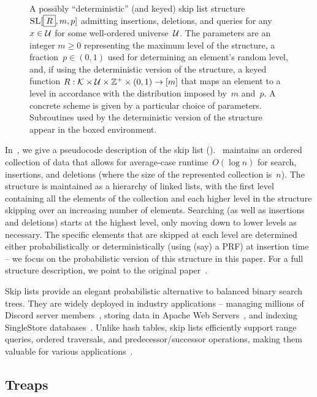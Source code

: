 \begin{figure*}[h]
\begin{pchstack}[boxed,center,space=0.5em]
    \end{pchstack}
    \caption[Skip List Structure.]{A possibly ``deterministic'' (and keyed) skip list structure $\textnormal{\textsc{SL}}[\boxed{R},m,p]$ admitting insertions, deletions, and queries for any~$x \in \mathcal{U}$ for some well-ordered universe~$\mathcal{U}$. The parameters are an integer $m \geq 0$ representing the maximum level of the structure, a fraction~$p \in (0,1)$ used for determining an element's random level, and, if using the deterministic version of the structure, a keyed function $R: \mathcal{K} \times \mathcal{U} \times \mathbb{Z}^{+} \times (0,1) \to [m]$ that maps an element to a level in accordance with the distribution imposed by~$m$ and~$p$. A concrete scheme is given by a particular choice of parameters. Subroutines used by the deterministic version of the structure appear in the boxed environment. 
    } 
    \label{fig:sl}
\end{figure*}

In~, we give a pseudocode description of the skip list (\SL). \SL \ maintains an ordered collection of data that allows for average-case runtime~$O(\log n)$ for search, insertions, and deletions (where the size of the represented collection is~$n$). The structure is maintained as a hierarchy of linked lists, with the first level containing all the elements of the collection and each higher level in the structure skipping over an increasing number of elements. Searching (as well as insertions and deletions) starts at the highest level, only moving down to lower levels as necessary. The specific elements that are skipped at each level are determined either probabilistically or deterministically (using (say) a PRF) at insertion time -- we focus on the probabilistic version of this structure in this paper. For a full structure description, we point to the original paper~\cite{pugh}. 

Skip lists provide an elegant probabilistic alternative to balanced binary search trees. They are widely deployed in industry applications -- managing millions of Discord server members~\cite{discord}, storing data in Apache Web Servers~\cite{apache}, and indexing SingleStore databases~\cite{singlestore}. Unlike hash tables, skip lists efficiently support range queries, ordered traversals, and predecessor/successor operations, making them valuable for various applications~\cite{quantumwalk, skabnet, InPlaceKV}.

\subsection{Treaps}
\label{prelim:tr}

